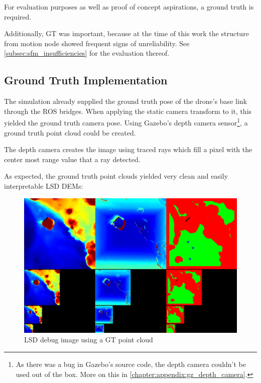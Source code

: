 For evaluation purposes as well as proof of concept aspirations, a ground truth is required. 

Additionally, GT was important, because at the time of this work the structure from motion node showed frequent signs of unreliability. See \cref{subsec:sfm_insufficiencies} for the evaluation thereof.

\subsection{Ground Truth Implementation}
The simulation already supplied the ground truth pose of the drone's base link through the ROS bridges. When applying the static camera transform to it, this yielded the ground truth camera pose. Using Gazebo's depth camera sensor\footnote[1]{As there was a bug in Gazebo's source code, the depth camera couldn't be used out of the box. More on this in \cref{chapter:appendix:gz_depth_camera}.}, a ground truth point cloud could be created.

The depth camera creates the image using traced rays which fill a pixel with the center most range value that a ray detected.

As expected, the ground truth point clouds yielded very clean and easily interpretable LSD DEMs:

\begin{figure}[ht]
\centering
\includegraphics[scale=0.25]{images/methodology/lsd_debug_image.png}
\caption{LSD debug image using a GT point cloud}
\label{fig:gt_lsd_debug}
\end{figure}

